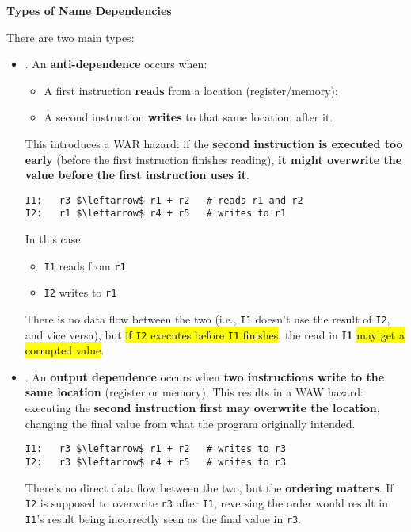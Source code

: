 \highspace
\begin{flushleft}
    \textcolor{Green3}{ \textbf{Types of Name Dependencies}}
\end{flushleft}
There are two main types:
\begin{itemize}
    \item {}. An \textbf{anti-dependence} occurs when:
    \begin{itemize}
        \item A first instruction \textbf{reads} from a location (register/memory);
        \item A second instruction \textbf{writes} to that same location, after it.
    \end{itemize}
    This introduces a WAR hazard: if the \textbf{second instruction is executed too early} (before the first instruction finishes reading), \textbf{it might overwrite the value before the first instruction uses it}.

    \begin{examplebox}
        \begin{lstlisting}[language=riscv, mathescape=true]
I1:   r3 $\leftarrow$ r1 + r2   # reads r1 and r2
I2:   r1 $\leftarrow$ r4 + r5   # writes to r1\end{lstlisting}
        In this case:
        \begin{itemize}
            \item \texttt{I1} reads from \texttt{r1}
            \item \texttt{I2} writes to \texttt{r1}
        \end{itemize}
        There is no data flow between the two (i.e., \texttt{I1} doesn't use the result of \texttt{I2}, and vice versa), but \hl{if \texttt{I2} executes before \texttt{I1} finishes}, the read in \textbf{I1} \hl{may get a corrupted value}.
    \end{examplebox}


    \item {}. An \textbf{output dependence} occurs when \textbf{two instructions write to the same location} (register or memory). This results in a WAW hazard: executing the \textbf{second instruction first may overwrite the location}, changing the final value from what the program originally intended.

    \begin{examplebox}
        \begin{lstlisting}[language=riscv, mathescape=true]
I1:   r3 $\leftarrow$ r1 + r2   # writes to r3
I2:   r3 $\leftarrow$ r4 + r5   # writes to r3\end{lstlisting}
        There's no direct data flow between the two, but the \textbf{ordering matters}. If \texttt{I2} is supposed to overwrite \texttt{r3} after \texttt{I1}, reversing the order would result in \texttt{I1}'s result being incorrectly seen as the final value in \texttt{r3}.
    \end{examplebox}
\end{itemize}

